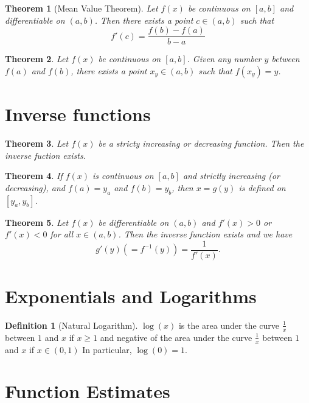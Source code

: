 \documentclass[11pt,a4paper]{article}
\newtheorem{theorem}{Theorem}
\theoremstyle{definition}
\newtheorem{definition}{Definition}
\begin{document}
\begin{theorem}[Mean Value Theorem]
    Let $ f(x) $ be continuous on $ [a,b] $ and differentiable on $ (a, b) $.
    Then there exists a point $ c \in (a, b) $ such that 
    \[ f'(c) = \frac{f(b) - f(a)}{b - a}\]
\end{theorem}

\begin{theorem}
    Let $ f(x) $ be continuous on $ [a,b] $. Given any number $ y $ between $ f(a) $ and $ f(b) $, there exists a point $ x_y \in (a, b) $ such that $ f(x_y)  = y $.
\end{theorem}

\section{Inverse functions} 

\begin{theorem}
    Let $ f(x) $ be a stricty increasing or decreasing function. Then the inverse fuction exists.
\end{theorem}

\begin{theorem}
    If $ f(x) $ is continuous on $ [a, b] $ and strictly increasing (or decreasing), and $ f(a) = y_a $ and $ f(b) = y_b $, then $ x = g(y) $ is defined on $ [y_a, y_b] $.
\end{theorem}

\begin{theorem}
    Let $ f(x) $ be differentiable on $ (a, b) $ and $ f'(x) > 0 $ or $ f'(x) < 0 $ for all $ x \in (a, b) $. Then the inverse function exists and we have
    \[ g'(y)\left(= f^{-1}(y)\right) = \frac{1}{f'(x)}.\]
\end{theorem}

\section{Exponentials and Logarithms}

\begin{definition}[Natural Logarithm]
   $ \log(x) $ is the area under the curve $ \frac{1}{x} $ between $ 1 $ and $ x $ if $ x \geq 1 $ and negative of the area under the curve $ \frac{1}{x} $ between $ 1 $ and $ x $ if $ x \in (0, 1) $
   In particular, $ \log(0) = 1 $.
\end{definition}

\section{Function Estimates}
\end{document}
